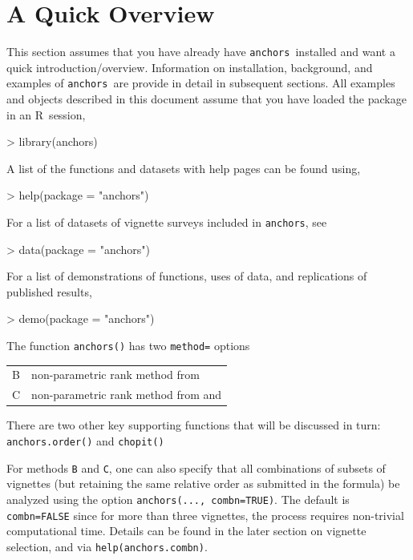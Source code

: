 \documentclass{amsart}
\newcommand{\code}[1]{{\texttt{#1}}}
\newcommand{\R}{{\normalfont\textsf{R}}{}}
\newcommand{\Ranchors}{{\texttt{anchors}}}
\begin{document}
\section{A Quick Overview}

This section assumes that you have already have \Ranchors\ installed
and want a quick introduction/overview.  Information on installation,
background, and examples of \Ranchors\ are provide in detail in
subsequent sections.  All examples and objects described in this
document assume that you have loaded the package in an \R\ session,
\begin{Schunk}
\begin{Sinput}
> library(anchors)
\end{Sinput}
\end{Schunk}

A list of the functions and datasets with help pages can be found using,
\begin{Schunk}
\begin{Sinput}
> help(package = "anchors")
\end{Sinput}
\end{Schunk}
For a list of datasets of vignette surveys included in \Ranchors, see
\begin{Schunk}
\begin{Sinput}
> data(package = "anchors")
\end{Sinput}
\end{Schunk}
For a list of demonstrations of functions, uses of data, and
replications of published results,
\begin{Schunk}
\begin{Sinput}
> demo(package = "anchors")
\end{Sinput}
\end{Schunk}
The function \code{anchors()} has two \code{method=} options

\begin{tabular}{ll}
  B   & non-parametric rank method from \cite{wand:2007a}\\
  C   & non-parametric rank method from \cite{king:2004} and \cite{king.wand:2007}\\
\end{tabular}

There are two other key supporting functions that will be discussed in
turn: \code{anchors.order()} and \code{chopit()}

\noindent
For methods \code{B} and \code{C}, one can also specify that all
combinations of subsets of vignettes (but retaining the same relative
order as submitted in the formula) be analyzed using the option
\code{anchors(..., combn=TRUE)}.  The default is \code{combn=FALSE}
since for more than three vignettes, the process requires non-trivial
computational time.  Details can be found in the later section on
vignette selection, and via \code{help(anchors.combn)}.
\end{document}
